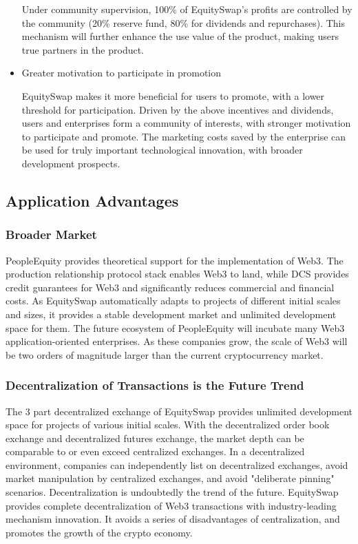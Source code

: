 \documentclass{article}
\begin{document}
\begin{itemize}
Under community supervision, 100\% of EquitySwap's profits are controlled by the community (20\% reserve fund, 80\% for dividends and repurchases). This mechanism will further enhance the use value of the product, making users true partners in the product.

\item Greater motivation to participate in promotion

EquitySwap makes it more beneficial for users to promote, with a lower threshold for participation. Driven by the above incentives and dividends, users and enterprises form a community of interests, with stronger motivation to participate and promote. The marketing costs saved by the enterprise can be used for truly important technological innovation, with broader development prospects.

\end{itemize}

\subsection{Application Advantages}
\subsubsection{Broader Market}

PeopleEquity provides theoretical support for the implementation of Web3. The production relationship protocol stack enables Web3 to land, while DCS provides credit guarantees for Web3 and significantly reduces commercial and financial costs. As EquitySwap automatically adapts to projects of different initial scales and sizes, it provides a stable development market and unlimited development space for them. The future ecosystem of PeopleEquity will incubate many Web3 application-oriented enterprises. As these companies grow, the scale of Web3 will be two orders of magnitude larger than the current cryptocurrency market.

\subsubsection{Decentralization of Transactions is the Future Trend}

The 3 part decentralized exchange of EquitySwap provides unlimited development space for projects of various initial scales. With the decentralized order book exchange and decentralized futures exchange, the market depth can be comparable to or even exceed centralized exchanges. In a decentralized environment, companies can independently list on decentralized exchanges, avoid market manipulation by centralized exchanges, and avoid "deliberate pinning" scenarios. Decentralization is undoubtedly the trend of the future. EquitySwap provides complete decentralization of Web3 transactions with industry-leading mechanism innovation. It avoids a series of disadvantages of centralization, and promotes the growth of the crypto economy.
\end{document}
